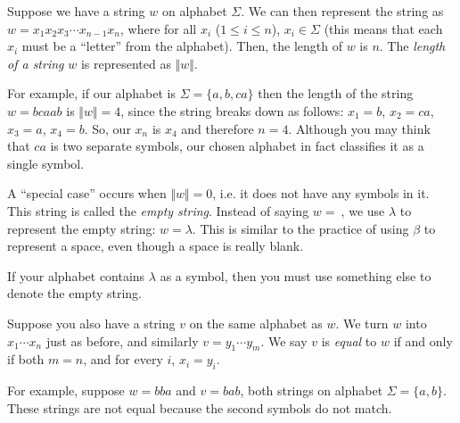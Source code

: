 \documentclass[12pt]{article}
\begin{document}
Suppose we have a string $w$ on alphabet $\Sigma$. We can then represent
the string as $w = x_1x_2x_3\cdots x_{n-1}x_n$, where for all $x_i$
($1 \leq i \leq n$), $x_i \in \Sigma$ (this means that each $x_i$ must
be a ``letter'' from the alphabet). Then, the length of $w$ is $n$. The
\emph{length of a string} $w$ is represented as $ \Vert w \Vert $.

For example, if our alphabet is $\Sigma = \{ a, b, ca \} $
then the length of the string $w = bcaab $ is $ \Vert w \Vert = 4$, since
the string breaks down as follows: $ x_1 = b$, $x_2 = ca $, $x_3 = a$, $x_4 = b$.
So, our $x_n$ is $x_4$ and therefore $ n = 4$. Although you may think that
$ca$ is two separate symbols, our chosen alphabet in fact classifies it as
a single symbol.

A ``special case'' occurs when $\Vert w \Vert = 0$, i.e. it does not have any symbols
in it. This string is called the \emph{empty string}. Instead of saying
$ w = \ $, we use $\lambda$ to represent the empty string:
$w = \lambda$. This is similar to the practice of using $\beta$
to represent a space, even though a space is really blank.

If your alphabet contains $\lambda$ as a symbol, then
you must use something else to denote the empty string.

Suppose you also have a string $v$ on the same alphabet as $w$. We turn
$w$ into $x_1 \cdots x_n $ just as before, and similarly $v = y_1 \cdots y_m $.
We say $v$ is \emph{equal} to $w$ if and only if both $m = n$, and
for every $i$, $x_i = y_i$.

For example, suppose $ w = bba $ and $v = bab$, both strings on alphabet $\Sigma = \{ a,b \}$.
These strings are not equal because the second symbols do not match.
\end{document}
